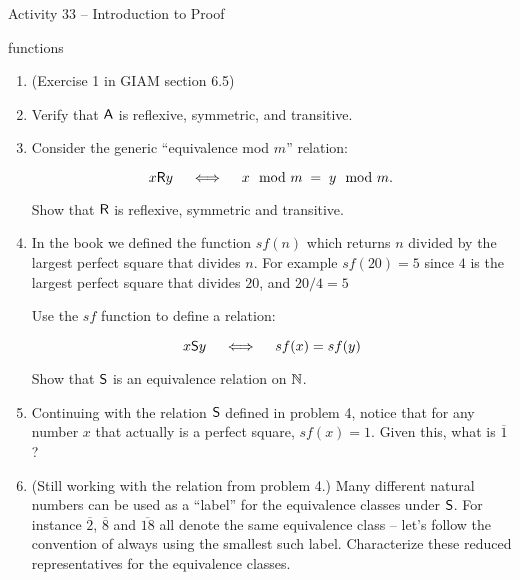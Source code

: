 \documentclass{amsart}
\begin{document}
\thispagestyle{empty}

\centerline{\Large Activity 33 -- Introduction to Proof}
\centerline{\large functions}

\bigskip
\Large


\begin{enumerate}
	
\item (Exercise 1 in GIAM section 6.5) 

\vfill

\item Verify that $\mbox{\textsf A}$ is reflexive, symmetric, and transitive.

\vfill

\vfill

\newpage

\item Consider the generic ``equivalence mod $m$'' relation:

\[ x \mbox{\textsf R} y \quad \iff \quad x \mod{m} \; = \; y \mod{m} . \]

Show that $\mbox{\textsf R}$ is reflexive, symmetric and transitive.  

\vfill

\newpage


\item In the book we defined the function $sf(n)$ which returns $n$ divided by the largest perfect square that divides $n$.  For example $sf(20) = 5$ since $4$ is the largest perfect square that divides $20$, and $20/4 = 5$ 

Use the $sf$ function to define a relation:

\[ x \mbox{\textsf S} y \quad \iff \quad sf(x) = sf(y) \]

Show that $\mbox{\textsf S}$ is an equivalence relation on ${\mathbb N}$.

\vfill 

\newpage

\item Continuing with the relation $\mbox{\textsf S}$ defined in problem 4, notice that for any number $x$ that actually is a perfect square, $sf(x) = 1$.  Given this, what is $\overline{1}$?

\vfill


\item (Still working with the relation from problem 4.)  Many different natural numbers can be used as a ``label'' for the equivalence classes under $\mbox{\textsf S}$.  For instance $\overline{2}$, $\overline{8}$ and $\overline{18}$ all denote the same equivalence class -- let's follow the convention of always using the smallest such label.  Characterize these reduced representatives for the equivalence classes.


\end{enumerate}
\end{document}
